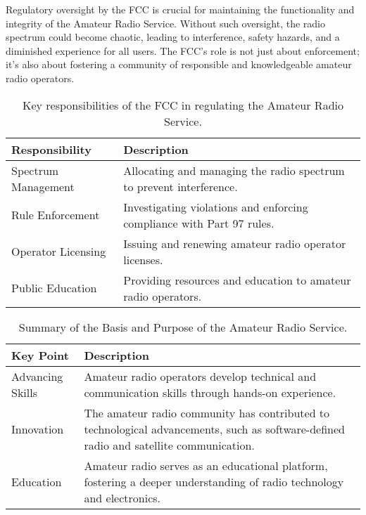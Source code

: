 Regulatory oversight by the FCC is crucial for maintaining the functionality and integrity of the Amateur Radio Service. Without such oversight, the radio spectrum could become chaotic, leading to interference, safety hazards, and a diminished experience for all users. The FCC's role is not just about enforcement; it's also about fostering a community of responsible and knowledgeable amateur radio operators.

\begin{table}[h]
    \centering
    \begin{tabular}{|l|p{}|}
        \hline
        \textbf{Responsibility} & \textbf{Description} \\
        \hline
        Spectrum Management & Allocating and managing the radio spectrum to prevent interference. \\
        Rule Enforcement & Investigating violations and enforcing compliance with Part 97 rules. \\
        Operator Licensing & Issuing and renewing amateur radio operator licenses. \\
        Public Education & Providing resources and education to amateur radio operators. \\
        \hline
    \end{tabular}
    \caption{Key responsibilities of the FCC in regulating the Amateur Radio Service.}
    \label{tab:fcc-responsibilities}
\end{table}



\begin{table}[h]
    \centering
    \begin{tabular}{|l|p{}|}
        \hline
        \textbf{Key Point} & \textbf{Description} \\
        \hline
        Advancing Skills & Amateur radio operators develop technical and communication skills through hands-on experience. \\
        \hline
        Innovation & The amateur radio community has contributed to technological advancements, such as software-defined radio and satellite communication. \\
        \hline
        Education & Amateur radio serves as an educational platform, fostering a deeper understanding of radio technology and electronics. \\
        \hline
    \end{tabular}
    \caption{Summary of the Basis and Purpose of the Amateur Radio Service.}
    \label{tab:radio-purpose-summary}
\end{table}

